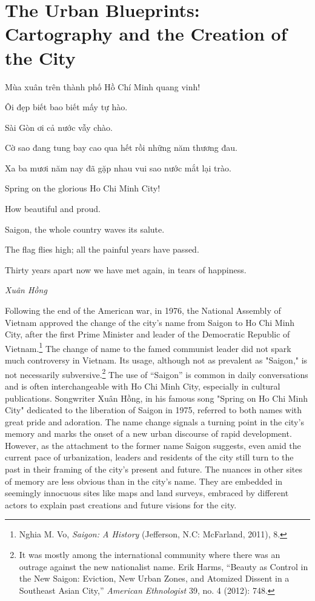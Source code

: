 \chapter[The Urban Blueprints]{The Urban Blueprints: Cartography and the Creation of the City}\label{cartography}
\setlength{\epigraphwidth}{4.5 in}
\begin{minipage}{\textwidth}
\epigraph{\vi Mùa xuân trên thành phố Hồ Chí Minh quang vinh!

Ôi đẹp biết bao biết mấy tự hào.

Sài Gòn ơi cả nước vẫy chào.

Cờ sao đang tung bay cao qua hết rồi những năm thương đau.

Xa ba mươi năm nay đã gặp nhau vui sao nước mắt lại trào.

\vspace{.1 in}
Spring on the glorious Ho Chi Minh City!

How beautiful and proud.

Saigon, the whole country waves its salute.

The flag flies high; all the painful years have passed.

Thirty years apart now we have met again, in tears of happiness.}{\vi \textit{Xuân Hồng}\footnotemark}
\end{minipage} 
\vi Following the end of the American war, in 1976, the National Assembly of Vietnam approved the change of the city's name from Saigon to Ho Chi Minh City, after the first Prime Minister and leader of the Democratic Republic of Vietnam.\footnote{Nghia M. Vo, \textit{Saigon: A History} (Jefferson, N.C: McFarland, 2011), 8.}  The change of name to the famed communist leader did not spark much controversy in Vietnam. Its usage, although not as prevalent as "Saigon," is not necessarily subversive.\footnote{It was mostly among the international community where there was an outrage against the new nationalist name. Erik Harms, “Beauty as Control in the New Saigon: Eviction, New Urban Zones, and Atomized Dissent in a Southeast Asian City,” \textit{American Ethnologist} 39, no. 4 (2012): 748.} The use of “Saigon” is common in daily conversations and is often interchangeable with Ho Chi Minh City, especially in cultural publications.  Songwriter Xuân Hồng, in his famous song "Spring on Ho Chi Minh City" dedicated to the liberation of Saigon in 1975, referred to both names with great pride and adoration. The name change signals a turning point in the city's memory and marks the onset of a new urban discourse of rapid development. However, as the attachment to the former name Saigon suggests, even amid the current pace of urbanization, leaders and residents of the city still turn to the past in their framing of the city's present and future. The nuances in other sites of memory are less obvious than in the city's name. They are embedded in seemingly innocuous sites like maps and land surveys, embraced by different actors to explain past creations and future visions for the city.

